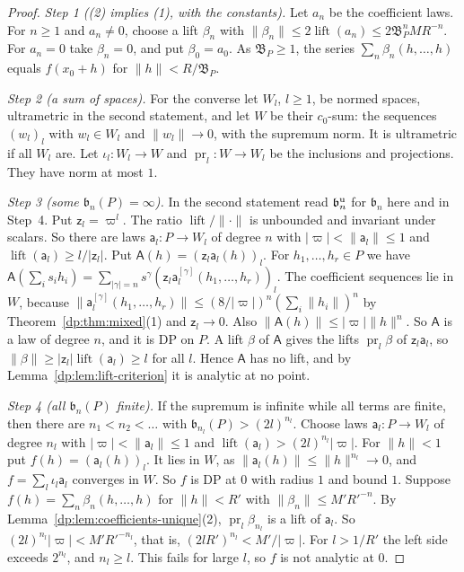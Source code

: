 \documentclass[11pt]{amsart}
\theoremstyle{definition}
\theoremstyle{remark}
\numberwithin{equation}{section}
\newcommand{\abs}[1]{\lvert #1\rvert}
\newcommand{\norm}[1]{\lVert #1\rVert}
\theoremstyle{plain}
\theoremstyle{definition}
\theoremstyle{plain}
\begin{document}
\begin{proof}
\emph{Step 1 ((2) implies (1), with the constants).} Let $a_n$ be the coefficient laws. For $n\ge1$ and $a_n\ne0$, choose a lift $\beta_n$ with $\norm{\beta_n}\le2\operatorname{lift}(a_n)\le2\mathfrak B_P^nMR^{-n}$. For $a_n=0$ take $\beta_n=0$, and put $\beta_0=a_0$. As $\mathfrak B_P\ge1$, the series $\sum_n\beta_n(h,\dots,h)$ equals $f(x_0+h)$ for $\norm h<R/\mathfrak B_P$.

\emph{Step 2 (a sum of spaces).} For the converse let $W_l$, $l\ge1$, be normed spaces, ultrametric in the second statement, and let $W$ be their $c_0$-sum: the sequences $(w_l)_l$ with $w_l\in W_l$ and $\norm{w_l}\to0$, with the supremum norm. It is ultrametric if all $W_l$ are. Let $\iota_l\colon W_l\to W$ and $\operatorname{pr}_l\colon W\to W_l$ be the inclusions and projections. They have norm at most $1$.

\emph{Step 3 (some $\mathfrak b_n(P)=\infty$).} In the second statement read $\mathfrak b^{\rm u}_n$ for $\mathfrak b_n$ here and in Step~4. Put $\mathsf z_l=\varpi^l$. The ratio $\operatorname{lift}/\norm\cdot$ is unbounded and invariant under scalars. So there are laws $\mathsf a_l\colon P\to W_l$ of degree $n$ with $\abs\varpi<\norm{\mathsf a_l}\le1$ and $\operatorname{lift}(\mathsf a_l)\ge l/\abs{\mathsf z_l}$. Put $\mathsf A(h)=(\mathsf z_l\mathsf a_l(h))_l$. For $h_1,\dots,h_r\in P$ we have $\mathsf A(\sum_is_ih_i)=\sum_{\abs\gamma=n}s^\gamma(\mathsf z_l\mathsf a_l^{[\gamma]}(h_1,\dots,h_r))_l$. The coefficient sequences lie in $W$, because $\norm{\mathsf a_l^{[\gamma]}(h_1,\dots,h_r)}\le(8/\abs\varpi)^n(\sum_i\norm{h_i})^n$ by Theorem~\ref{dp:thm:mixed}(1) and $\mathsf z_l\to0$. Also $\norm{\mathsf A(h)}\le\abs\varpi\norm h^n$. So $\mathsf A$ is a law of degree $n$, and it is DP on $P$. A lift $\beta$ of $\mathsf A$ gives the lifts $\operatorname{pr}_l\beta$ of $\mathsf z_l\mathsf a_l$, so $\norm\beta\ge\abs{\mathsf z_l}\operatorname{lift}(\mathsf a_l)\ge l$ for all $l$. Hence $\mathsf A$ has no lift, and by Lemma~\ref{dp:lem:lift-criterion} it is analytic at no point.

\emph{Step 4 (all $\mathfrak b_n(P)$ finite).} If the supremum is infinite while all terms are finite, then there are $n_1<n_2<\dots$ with $\mathfrak b_{n_l}(P)>(2l)^{n_l}$. Choose laws $\mathsf a_l\colon P\to W_l$ of degree $n_l$ with $\abs\varpi<\norm{\mathsf a_l}\le1$ and $\operatorname{lift}(\mathsf a_l)>(2l)^{n_l}\abs\varpi$. For $\norm h<1$ put $f(h)=(\mathsf a_l(h))_l$. It lies in $W$, as $\norm{\mathsf a_l(h)}\le\norm h^{n_l}\to0$, and $f=\sum_l\iota_l\mathsf a_l$ converges in $W$. So $f$ is DP at $0$ with radius $1$ and bound $1$. Suppose $f(h)=\sum_n\beta_n(h,\dots,h)$ for $\norm h<R'$ with $\norm{\beta_n}\le M'R'^{-n}$. By Lemma~\ref{dp:lem:coefficients-unique}(2), $\operatorname{pr}_l\beta_{n_l}$ is a lift of $\mathsf a_l$. So $(2l)^{n_l}\abs\varpi<M'R'^{-n_l}$, that is, $(2lR')^{n_l}<M'/\abs\varpi$. For $l>1/R'$ the left side exceeds $2^{n_l}$, and $n_l\ge l$. This fails for large $l$, so $f$ is not analytic at $0$.
\end{proof}
\end{document}
